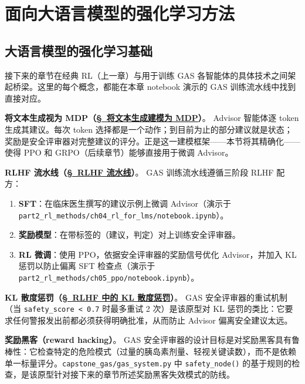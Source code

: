 \part{面向大语言模型的强化学习方法}

\chapter{大语言模型的强化学习基础}
\label{rl-foundations-for-language-models}

\begin{keybox}
接下来的章节在经典 RL（上一章）与用于训练 GAS 各智能体的具体技术之间架起桥梁。这里的每个概念，都能在本章 notebook 演示的 GAS 训练流水线中找到直接对应。

\textbf{将文本生成视为 MDP（\hyperref[text-generation-as-mdp]{\S~将文本生成建模为 MDP}）}。
Advisor 智能体逐 token 生成其建议。每次 token 选择都是一个动作；到目前为止的部分建议就是状态；奖励是安全评审器对完整建议的评分。正是这一建模框架——本节将其精确化——使得 PPO 和 GRPO（后续章节）能够直接用于微调 Advisor。

\textbf{RLHF 流水线（\hyperref[the-rlhf-pipeline]{\S~RLHF 流水线}）}。
GAS 训练流水线遵循三阶段 RLHF 配方：
\begin{enumerate}
  \item \textbf{SFT}：在临床医生撰写的建议示例上微调 Advisor（演示于 \texttt{part2\_rl\_methods/ch04\_rl\_for\_lms/notebook.ipynb}）。
  \item \textbf{奖励模型}：在带标签的（建议，判定）对上训练安全评审器。
  \item \textbf{RL 微调}：使用 PPO，依据安全评审器的奖励信号优化 Advisor，并加入 KL 惩罚以防止偏离 SFT 检查点（演示于 \texttt{part2\_rl\_methods/ch05\_ppo/notebook.ipynb}）。
\end{enumerate}

\textbf{KL 散度惩罚（\hyperref[kl-divergence-in-rlhf]{\S~RLHF 中的 KL 散度惩罚}）}。
GAS 安全评审器的重试机制（当 \texttt{safety\_score < 0.7} 时最多重试 2 次）是该原型对 KL 惩罚的类比：它要求任何警报发出前都必须获得明确批准，从而防止 Advisor 偏离安全建议太远。

\textbf{奖励黑客（reward hacking）}。
GAS 安全评审器的设计目标是对奖励黑客具有鲁棒性：它检查特定的危险模式（过量的胰岛素剂量、轻视关键读数），而不是依赖单一标量评分。\texttt{capstone\_gas/gas\_system.py} 中 \texttt{safety\_node()} 的基于规则的检查，是该原型针对接下来的章节所述奖励黑客失效模式的防线。
\end{keybox}

